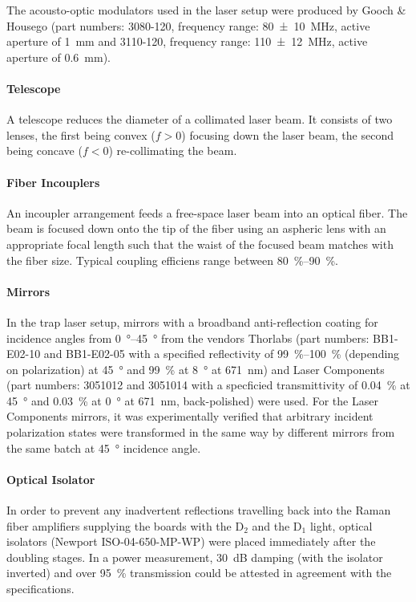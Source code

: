 The acousto-optic modulators used in the laser setup were produced by Gooch \& Housego (part numbers: 3080-120, frequency range: \SI{80(10)}{\mega\hertz}, active aperture of \SI{1}{\milli\meter} and 3110-120, frequency range: \SI{110(12)}{\mega\hertz}, active aperture of \SI{0.6}{\milli\meter}).

\paragraph{Telescope} A telescope reduces the diameter of a collimated laser beam. It consists of two lenses, the first being convex ($f > 0$) focusing down the laser beam, the second being concave ($f < 0$) re-collimating the beam.
    
\paragraph{Fiber Incouplers} An incoupler arrangement feeds a free-space laser beam into an optical fiber. The beam is focused down onto the tip of the fiber using an aspheric lens with an appropriate focal length such that the waist of the focused beam matches with the fiber size. Typical coupling efficiens range between \SIrange[]{80}{90}{\percent}.
    
\paragraph{Mirrors}
In the trap laser setup, mirrors with a broadband anti-reflection coating for incidence angles from \SIrange[]{0}{45}{\degree} from the vendors Thorlabs (part numbers: BB1-E02-10 and BB1-E02-05 with a specified reflectivity of \SIrange[]{99}{100}{\percent} (depending on polarization) at \SI[]{45}{\degree} and \SI[]{99}{\percent} at \SI[]{8}{\degree} at \SI[]{671}{\nano\meter}) and Laser Components (part numbers: 3051012 and 3051014 with a specficied transmittivity of \SI[]{0.04}{\percent} at \SI[]{45}{\degree} and \SI[]{0.03}{\percent} at \SI[]{0}{\degree} at \SI[]{671}{\nano\meter}, back-polished) were used. For the Laser Components mirrors, it was experimentally verified that arbitrary incident polarization states were transformed in the same way by different mirrors from the same batch at \SI[]{45}{\degree} incidence angle.

\paragraph{Optical Isolator}
In order to prevent any inadvertent reflections travelling back into the Raman fiber amplifiers supplying the boards with the D$_2$ and the D$_1$ light, optical isolators (Newport ISO-04-650-MP-WP) were placed immediately after the doubling stages. In a power measurement, \SI{30}{\deci\bel} damping (with the isolator inverted) and over \SI{95}{\percent} transmission could be attested in agreement with the specifications.

